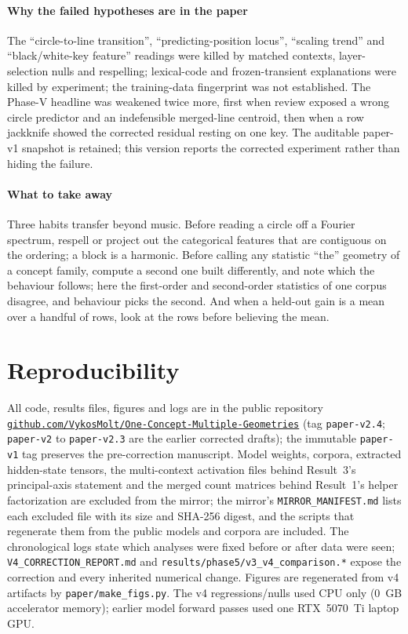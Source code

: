 \documentclass[11pt]{article}
\begin{document}
\paragraph{Why the failed hypotheses are in the paper} The ``circle-to-line transition'', ``predicting-position locus'', ``scaling trend'' and ``black/white-key feature'' readings were killed by matched contexts, layer-selection nulls and respelling; lexical-code and frozen-transient explanations were killed by experiment; the training-data fingerprint was not established. The Phase-V headline was weakened twice more, first when review exposed a wrong circle predictor and an indefensible merged-line centroid, then when a row jackknife showed the corrected residual resting on one key. The auditable paper-v1 snapshot is retained; this version reports the corrected experiment rather than hiding the failure.

\paragraph{What to take away} Three habits transfer beyond music. Before reading a circle off a Fourier spectrum, respell or project out the categorical features that are contiguous on the ordering; a block is a harmonic. Before calling any statistic ``the'' geometry of a concept family, compute a second one built differently, and note which the behaviour follows; here the first-order and second-order statistics of one corpus disagree, and behaviour picks the second. And when a held-out gain is a mean over a handful of rows, look at the rows before believing the mean.

\section*{Reproducibility}
All code, results files, figures and logs are in the public repository \href{https://github.com/VykosMolt/One-Concept-Multiple-Geometries}{\mbox{\texttt{github.com/VykosMolt/}}\allowbreak\mbox{\texttt{One-Concept-Multiple-Geometries}}} (tag \texttt{paper-v2.4}; \texttt{paper-v2} to \texttt{paper-v2.3} are the earlier corrected drafts); the immutable \texttt{paper-v1} tag preserves the pre-correction manuscript. Model weights, corpora, extracted hidden-state tensors, the multi-context activation files behind Result~3's principal-axis statement and the merged count matrices behind Result~1's helper factorization are excluded from the mirror; the mirror's \texttt{MIRROR\_MANIFEST.md} lists each excluded file with its size and SHA-256 digest, and the scripts that regenerate them from the public models and corpora are included. The chronological logs state which analyses were fixed before or after data were seen; \texttt{V4\_CORRECTION\_REPORT.md} and \texttt{results/phase5/v3\_v4\_comparison.*} expose the correction and every inherited numerical change. Figures are regenerated from v4 artifacts by \texttt{paper/make\_figs.py}. The v4 regressions/nulls used CPU only (0~GB accelerator memory); earlier model forward passes used one RTX~5070~Ti laptop GPU.
\end{document}
